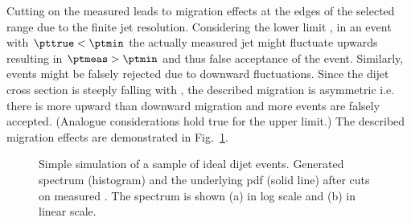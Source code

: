 \documentclass[a4paper]{cmspaper} %
\begin{document}
Cutting on the measured \pt leads to migration effects at the edges of the selected \pt range due to the finite jet resolution.
Considering the lower limit \ptmin, in an event with \mbox{$\pttrue < \ptmin$} the actually measured jet \pt might fluctuate upwards resulting in \mbox{$\ptmeas > \ptmin$} and thus false acceptance of the event.
Similarly, events might be falsely rejected due to downward fluctuations.
Since the dijet cross section is steeply falling with \pt, the described migration is asymmetric i.e. there is more upward than downward migration and more events are falsely accepted.
(Analogue considerations hold true for the upper limit.)
The described migration effects are demonstrated in Fig.~\ref{fig:resFit:toyMC:ptCuts:spectrum}.

\begin{figure}[ht]
  \begin{center}
     
  \end{center}
  \caption{Simple simulation of a sample of ideal dijet
    events. Generated \pttrue spectrum (histogram) and the underlying pdf (solid
    line) after cuts on measured \pt. The spectrum is shown (a) in log
    scale and (b) in linear scale.}
  \label{fig:resFit:toyMC:ptCuts:spectrum}
\end{figure}
\end{document}
